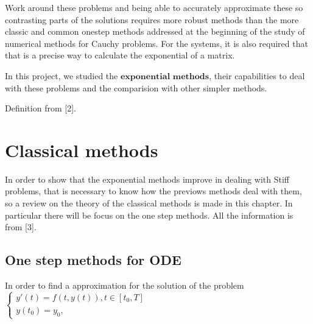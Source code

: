 \documentclass[letterpaper,10pt,english]{jupyterBook}
\begin{document}
\sphinxAtStartPar
Work around these problems and being able to accurately approximate these so contrasting parts of the solutions requires more robust methods than the more classic and common one\sphinxhyphen{}step methods addressed at the beginning of the study of numerical methods for Cauchy problems. For the systems, it is also required that that is a precise way to calculate the exponential of a matrix.

\sphinxAtStartPar
In this project, we studied the \(\textbf{exponential methods}\), their capabilities to deal with these problems and the comparision with other simpler methods.

\sphinxAtStartPar
Definition from {[}2{]}.

\sphinxstepscope


\section{Classical methods}
\label{\detokenize{cap2:classical-methods}}\label{\detokenize{cap2::doc}}
\sphinxAtStartPar
In order to show that the exponential methods improve in dealing with Stiff problems, that is necessary to know how the previows methods deal with them, so a review on the theory of the classical methods is made in this chapter. In particular there will be focus on the one step methods. All the information is from {[}3{]}.


\subsection{One step methods for ODE}
\label{\detokenize{cap2:one-step-methods-for-ode}}
\sphinxAtStartPar
In order to find a approximation for the solution of the problem
\(\begin{cases}
y'(t) = f(t, y(t)), t \in [t_0,T] \\
y(t_0)=y_0 \text{,}
\end{cases}\)
\end{document}
